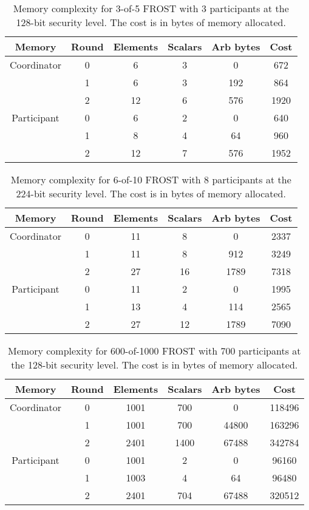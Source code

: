 \begin{table}
	\centering
	\begin{tabular}{c c c c c c}
		\toprule
		Memory & Round & Elements & Scalars & Arb bytes & Cost \\ \midrule
		Coordinator & 0 & 6 & 3 & 0 & 672 \\
		            & 1 & 6 & 3 & 192 & 864 \\
		            & 2 & 12 & 6 & 576 & 1920 \\
		\midrule
		Participant & 0 & 6 & 2 & 0 & 640 \\
		            & 1 & 8 & 4 & 64 & 960 \\
		            & 2 & 12 & 7 & 576 & 1952 \\
		\bottomrule
	\end{tabular}
	\caption{Memory complexity for 3-of-5 FROST with 3 participants at the 128-bit security level. The cost is in bytes of memory allocated.}
\end{table}

\begin{table}
	\centering
	\begin{tabular}{c c c c c c}
		\toprule
		Memory & Round & Elements & Scalars & Arb bytes & Cost \\ \midrule
		Coordinator & 0 & 11 & 8 & 0 & 2337 \\
		            & 1 & 11 & 8 & 912 & 3249 \\
		            & 2 & 27 & 16 & 1789 & 7318 \\
		\midrule
		Participant & 0 & 11 & 2 & 0 & 1995 \\
		            & 1 & 13 & 4 & 114 & 2565 \\
		            & 2 & 27 & 12 & 1789 & 7090 \\
		\bottomrule
	\end{tabular}
	\caption{Memory complexity for 6-of-10 FROST with 8 participants at the 224-bit security level. The cost is in bytes of memory allocated.}
\end{table}

\begin{table}
	\centering
	\begin{tabular}{c c c c c c}
		\toprule
		Memory & Round & Elements & Scalars & Arb bytes & Cost \\ \midrule
		Coordinator & 0 & 1001 & 700 & 0 & 118496 \\
		            & 1 & 1001 & 700 & 44800 & 163296 \\
		            & 2 & 2401 & 1400 & 67488 & 342784 \\
		\midrule
		Participant & 0 & 1001 & 2 & 0 & 96160 \\
		            & 1 & 1003 & 4 & 64 & 96480 \\
		            & 2 & 2401 & 704 & 67488 & 320512 \\
		\bottomrule
	\end{tabular}
	\caption{Memory complexity for 600-of-1000 FROST with 700 participants at the 128-bit security level. The cost is in bytes of memory allocated.}
\end{table}

